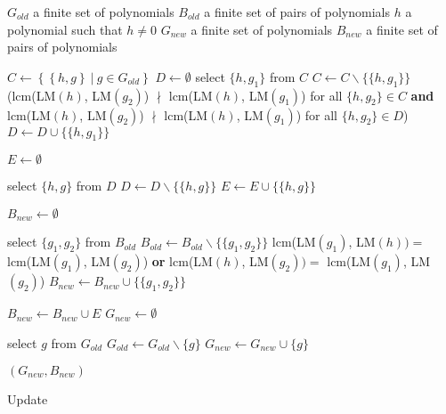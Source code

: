 \begin{algorithm}[htp]
  \begin{algorithmic}[1]
    \Require
      \Statex $G_{old}$ a finite set of polynomials
      \Statex $B_{old}$ a finite set of pairs of polynomials
      \Statex $h$ a polynomial such that $h \neq 0$
    \Ensure
      \Statex $G_{new}$ a finite set of polynomials
      \Statex $B_{new}$ a finite set of pairs of polynomials
      \Statex

    \State $C \gets \left\{\left\{h, g\right\}\ |\ g\in G_{old}\right\}$
    \State $D \gets \emptyset$
      \State select $\{h,g_1\}$ from $C$
      \State $C \gets C\backslash \{\{h, g_1\}\}$
        \StatexIndent[3](lcm(LM$(h)$, LM$(g_2)$) $\nmid$ lcm(LM$(h)$, LM$(g_1)$) for all $\{h, g_2\}\in C$ \textbf{and}
        \StatexIndent[3]lcm(LM$(h)$, LM$(g_2)$) $\nmid$ lcm(LM$(h)$, LM$(g_1)$) for all $\{h, g_2\} \in D$) \algorithmicthen
        \State $D \gets D \cup \{\{h, g_1\}\}$
      \EndIf
    \EndWhile

    \State $E \gets \emptyset$

      \State select $\{h, g\}$ from $D$
      \State $D \gets D\backslash \{\{h, g\}\}$
        \State $E \gets E \cup \{\{h, g\}\}$
      \EndIf
    \EndWhile

    \State $B_{new} \gets \emptyset$

      \State select $\{g_1, g_2\}$ from $B_{old}$
      \State $B_{old} \gets B_{old} \backslash \{\{g_1, g_2\}\}$
        \StatexIndent[3]lcm(LM$(g_1)$, LM$(h)) = $ lcm(LM$(g_1)$, LM$(g_2)$) \textbf{or}
        \StatexIndent[3]lcm(LM$(h)$, LM$(g_2)) = $ lcm(LM$(g_1)$, LM$(g_2)$) \algorithmicthen
        \State $B_{new} \gets B_{new} \cup \{\{g_1, g_2\}\}$
      \EndIf
    \EndWhile

    \State $B_{new} \gets B_{new} \cup E$
    \State $G_{new} \gets \emptyset$
    
      \State select $g$ from $G_{old}$
      \State $G_{old} \gets G_{old} \backslash \{g\}$
        \State $G_{new} \gets G_{new} \cup \{g\}$
      \EndIf
    \EndWhile

    \State \Return $(G_{new}, B_{new})$

  \end{algorithmic}
  \caption{Update}
\end{algorithm}
